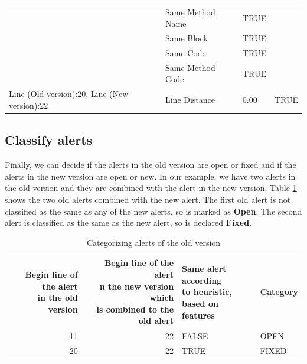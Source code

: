 \documentclass[
]{article}
\begin{document}
\begin{table}[H]
\begin{tabular}[t]{l|l|l|l}
 & Same Method Name & TRUE & \\

\rowcolor{gray!6}   & Same Block & TRUE & \\

 & Same Code & TRUE & \\

\rowcolor{gray!6}   & Same Method Code & TRUE & \\

\multirow[t]{-8}{*}{\raggedright\arraybackslash Line (Old version):20, Line (New version):22} & Line Distance & 0.00 & \multirow[t]{-8}{*}{\raggedright\arraybackslash TRUE}\\
\hline
\end{tabular}
\end{table}

\normalsize

\subsection{Classify alerts}\label{heuristic}

Finally, we can decide if the alerts in the old version are open or fixed
and if the alerts in the new version are open or new. In our example, we
have two alerts in the old version and they are combined with the alert
in the new version. Table \ref{tab_categorizing_old} shows the two old
alerts combined with the new alert. The first old alert is not
classified as the same as any of the new alerts, so is marked as
\textbf{Open}. The second alert is classified as the same as the new
alert, so is declared \textbf{Fixed}.

%
%

\small

\begin{table}[H]

\caption{\label{tab:unnamed-chunk-15}Categorizing alerts of the old version \label{tab_categorizing_old} }
\centering
\begin{tabular}[t]{r|r|l|l}
\hline
\makecell[l]{Begin line of the alert\\in the old version} & \makecell[l]{Begin line of the alert\\n the new version which\\is combined to the old alert} & \makecell[l]{Same alert according\\to heuristic,\\ based on features} & Category\\
\hline
\rowcolor{gray!6}  11 & 22 & FALSE & OPEN\\
\cline{1-4}
20 & 22 & TRUE & FIXED\\
\hline
\end{tabular}
\end{table}
\end{document}
